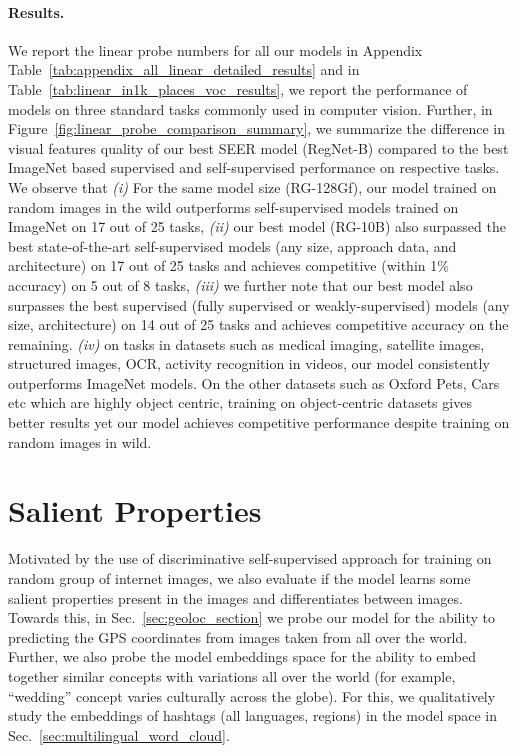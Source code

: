 \documentclass[10pt,twocolumn,letterpaper]{article}
\begin{document}
\paragraph{Results.}
We report the linear probe numbers for all our models in Appendix Table~\ref{tab:appendix_all_linear_detailed_results} and in Table~\ref{tab:linear_in1k_places_voc_results}, we report the performance of models on three standard tasks commonly used in computer vision. Further, in Figure~\ref{fig:linear_probe_comparison_summary}, we summarize the difference in visual features quality of our best SEER model (RegNet-B) compared to the best ImageNet based supervised and self-supervised performance on respective tasks. We observe that \textit{(i)} For the same model size (RG-128Gf), our model trained on random images in the wild outperforms self-supervised models trained on ImageNet on 17 out of 25 tasks, \textit{(ii)} our best model (RG-10B) also surpassed the best state-of-the-art self-supervised models (any size, approach data, and architecture) on 17 out of 25 tasks and achieves competitive (within 1\% accuracy) on 5 out of 8 tasks, \textit{(iii)} we further note that our best model also surpasses the best supervised (fully supervised or weakly-supervised) models (any size, architecture) on 14 out of 25 tasks and achieves competitive accuracy on the remaining. \textit{(iv)} on tasks in datasets such as medical imaging, satellite images, structured images, OCR, activity recognition in videos, our model consistently outperforms ImageNet models. On the other datasets such as Oxford Pets, Cars etc which are highly object centric, training on object-centric datasets gives better results yet our model achieves competitive performance despite training on random images in wild.



\section{Salient Properties}
Motivated by the use of discriminative self-supervised approach for training on random group of internet images, we also evaluate if the model learns some salient properties present in the images and differentiates between images. Towards this, in Sec.~\ref{sec:geoloc_section} we probe our model for the ability to predicting the GPS coordinates from images taken from all over the world. Further, we also probe the model embeddings space for the ability to embed together similar concepts with variations all over the world (for example, ``wedding'' concept varies culturally across the globe). For this, we qualitatively study the embeddings of hashtags (all languages, regions) in the model space in Sec.~\ref{sec:multilingual_word_cloud}.
\end{document}
